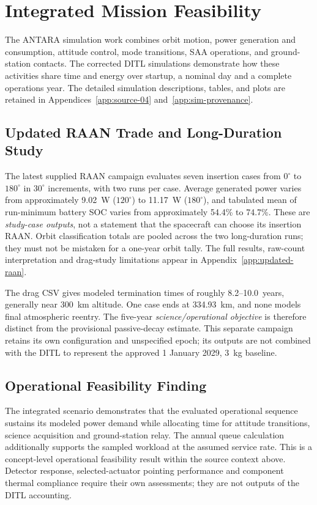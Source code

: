 \section{Integrated Mission Feasibility}\label{sec:simulation-results}
The ANTARA simulation work combines orbit motion, power generation and consumption, attitude control, mode transitions, SAA operations, and ground-station contacts. The corrected DITL simulations demonstrate how these activities share time and energy over startup, a nominal day and a complete operations year. The detailed simulation descriptions, tables, and plots are retained in Appendices~\ref{app:source-04} and~\ref{app:sim-provenance}.



\subsection{Updated RAAN Trade and Long-Duration Study}\label{sec:sim-annual}
The latest supplied RAAN campaign evaluates seven insertion cases from $0^\circ$ to $180^\circ$ in $30^\circ$ increments, with two runs per case. Average generated power varies from approximately 9.02~W ($120^\circ$) to 11.17~W ($180^\circ$), and tabulated mean of run-minimum battery SOC varies from approximately 54.4\% to 74.7\%. These are \emph{study-case outputs}, not a statement that the spacecraft can choose its insertion RAAN. Orbit classification totals are pooled across the two long-duration runs; they must not be mistaken for a one-year orbit tally. The full results, raw-count interpretation and drag-study limitations appear in Appendix~\ref{app:updated-raan}.

The drag CSV gives modeled termination times of roughly 8.2--10.0~years, generally near 300~km altitude. One case ends at 334.93~km, and none models final atmospheric reentry. The five-year \emph{science/operational objective} is therefore distinct from the provisional passive-decay estimate. This separate campaign retains its own configuration and unspecified epoch; its outputs are not combined with the DITL to represent the approved 1 January 2029, 3~kg baseline.

\subsection{Operational Feasibility Finding}\label{sec:sim-consolidated}
The integrated scenario demonstrates that the evaluated operational sequence sustains its modeled power demand while allocating time for attitude transitions, science acquisition and ground-station relay. The annual queue calculation additionally supports the sampled workload at the assumed service rate. This is a concept-level operational feasibility result within the source context above. Detector response, selected-actuator pointing performance and component thermal compliance require their own assessments; they are not outputs of the DITL accounting.
